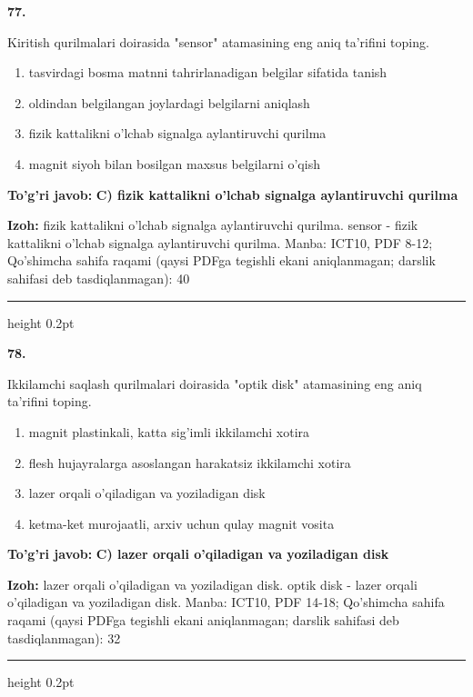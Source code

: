 \documentclass[10pt,a4paper]{article}
\begin{document}
{\bfseries\sffamily\color{ink} 77.}
\par
Kiritish qurilmalari doirasida "sensor" atamasining eng aniq ta'rifini toping.
\begin{enumerate}[label=\Alph*),leftmargin=9mm]
\item tasvirdagi bosma matnni tahrirlanadigan belgilar sifatida tanish
\item oldindan belgilangan joylardagi belgilarni aniqlash
\item fizik kattalikni o'lchab signalga aylantiruvchi qurilma
\item magnit siyoh bilan bosilgan maxsus belgilarni o'qish
\end{enumerate}
\begin{tcolorbox}[enhanced,breakable,colback=teal!4,colframe=teal!60!black,boxrule=0.45pt,arc=1.2mm,left=2.7mm,right=2.7mm,top=1.8mm,bottom=1.8mm,before skip=2mm,after skip=2mm]
{\bfseries\sffamily\color{teal}To'g'ri javob:} \textbf{C) fizik kattalikni o'lchab signalga aylantiruvchi qurilma}
\par\smallskip
{\bfseries Izoh:} fizik kattalikni o'lchab signalga aylantiruvchi qurilma. sensor - fizik kattalikni o'lchab signalga aylantiruvchi qurilma. Manba: ICT10, PDF 8-12; Qo'shimcha sahifa raqami (qaysi PDFga tegishli ekani aniqlanmagan; darslik sahifasi deb tasdiqlanmagan): 40
\end{tcolorbox}
\vspace{2mm}\hrule height 0.2pt\vspace{3mm}

{\bfseries\sffamily\color{ink} 78.}
\par
Ikkilamchi saqlash qurilmalari doirasida "optik disk" atamasining eng aniq ta'rifini toping.
\begin{enumerate}[label=\Alph*),leftmargin=9mm]
\item magnit plastinkali, katta sig'imli ikkilamchi xotira
\item flesh hujayralarga asoslangan harakatsiz ikkilamchi xotira
\item lazer orqali o'qiladigan va yoziladigan disk
\item ketma-ket murojaatli, arxiv uchun qulay magnit vosita
\end{enumerate}
\begin{tcolorbox}[enhanced,breakable,colback=teal!4,colframe=teal!60!black,boxrule=0.45pt,arc=1.2mm,left=2.7mm,right=2.7mm,top=1.8mm,bottom=1.8mm,before skip=2mm,after skip=2mm]
{\bfseries\sffamily\color{teal}To'g'ri javob:} \textbf{C) lazer orqali o'qiladigan va yoziladigan disk}
\par\smallskip
{\bfseries Izoh:} lazer orqali o'qiladigan va yoziladigan disk. optik disk - lazer orqali o'qiladigan va yoziladigan disk. Manba: ICT10, PDF 14-18; Qo'shimcha sahifa raqami (qaysi PDFga tegishli ekani aniqlanmagan; darslik sahifasi deb tasdiqlanmagan): 32
\end{tcolorbox}
\vspace{2mm}\hrule height 0.2pt\vspace{3mm}
\end{document}

